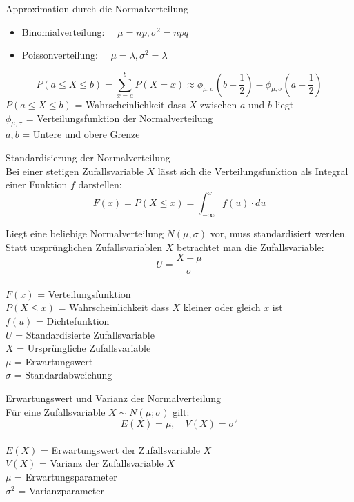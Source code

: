 \begin{theorem}{Approximation durch die Normalverteilung}
\begin{itemize}
  \item Binomialverteilung: $\quad \mu=np, \sigma^2=npq$
  \item Poissonverteilung: $\quad \mu=\lambda, \sigma^2=\lambda$
\end{itemize}

$$
P(a \leq X \leq b)=\sum_{x=a}^{b} P(X=x) \approx \phi_{\mu,\sigma}(b+\frac{1}{2})-\phi_{\mu,\sigma}(a-\frac{1}{2})
$$
$P(a \leq X \leq b)$ = Wahrscheinlichkeit dass $X$ zwischen $a$ und $b$ liegt\\
$\phi_{\mu,\sigma}$ = Verteilungsfunktion der Normalverteilung\\
$a, b$ = Untere und obere Grenze\\
\end{theorem}
\begin{definition}{Standardisierung der Normalverteilung}\\
Bei einer stetigen Zufallsvariable $X$ lässt sich die Verteilungsfunktion als Integral einer Funktion $f$ darstellen:
$$
F(x) = P(X \leq x) = \int_{-\infty}^x f(u) \cdot du
$$

Liegt eine beliebige Normalverteilung $N(\mu,\sigma)$ vor, muss standardisiert werden. Statt ursprünglichen Zufallsvariablen $X$ betrachtet man die Zufallsvariable:
$$
U = \frac{X-\mu}{\sigma}
$$
\\
$F(x)$ = Verteilungsfunktion\\
$P(X \leq x)$ = Wahrscheinlichkeit dass $X$ kleiner oder gleich $x$ ist\\
$f(u)$ = Dichtefunktion\\
$U$ = Standardisierte Zufallsvariable\\
$X$ = Ursprüngliche Zufallsvariable\\
$\mu$ = Erwartungswert\\
$\sigma$ = Standardabweichung\\
\end{definition}
\begin{definition}{Erwartungswert und Varianz der Normalverteilung}\\
Für eine Zufallsvariable $X \sim N(\mu;\sigma)$ gilt:
$$
E(X) = \mu, \quad V(X) = \sigma^2
$$
\\
$E(X)$ = Erwartungswert der Zufallsvariable $X$\\
$V(X)$ = Varianz der Zufallsvariable $X$\\
$\mu$ = Erwartungsparameter\\
$\sigma^2$ = Varianzparameter\\
\end{definition}


